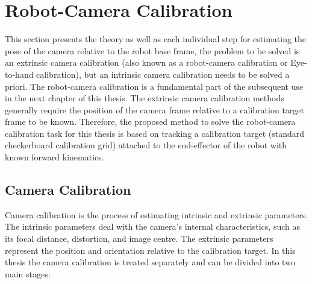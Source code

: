 
\chapter{Robot-Camera Calibration}
\label{chap:robot}
This section presents the theory as well as each individual step for estimating the pose of the camera relative to the robot base frame, the problem to be solved is an extrinsic camera calibration (also known as a robot-camera calibration or Eye-to-hand calibration), but an intrinsic camera calibration needs to be solved a priori. The robot-camera calibration is a fundamental part of the subsequent use in the next chapter of this thesis. The extrinsic camera calibration methods generally require the position of the camera frame relative to a calibration target frame to be known. Therefore, the proposed method to solve the robot-camera calibration task for this thesis is based on tracking a calibration target (standard checkerboard calibration grid) attached to the end-effector of the robot with known forward kinematics. 


\section{Camera Calibration}

Camera calibration is the process of estimating intrinsic and extrinsic parameters. The intrinsic parameters deal with the camera's internal characteristics, such as its focal distance, distortion, and image centre. The extrinsic parameters represent the position and orientation relative to the calibration target. In this thesis the camera calibration is treated separately and can be divided into two main stages:

